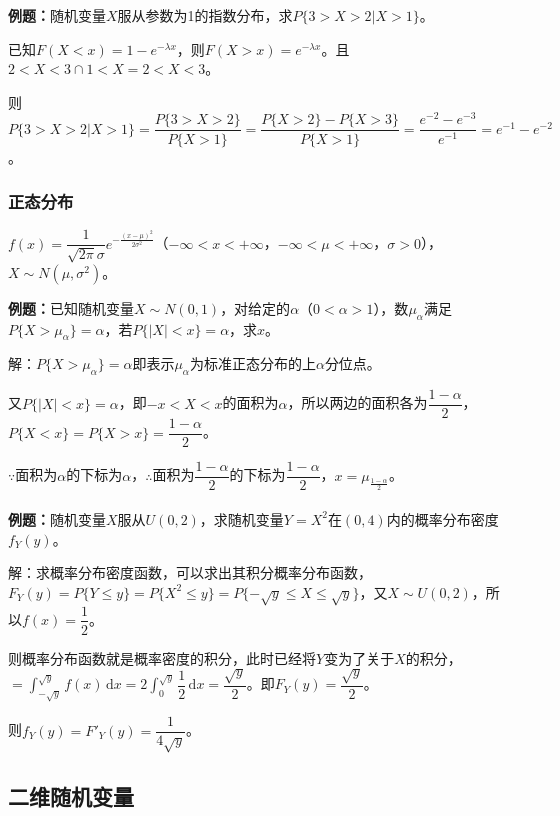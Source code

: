 \textbf{例题：}随机变量$X$服从参数为1的指数分布，求$P\{3>X>2|X>1\}$。

已知$F(X<x)=1-e^{-\lambda x}$，则$F(X>x)=e^{-\lambda x}$。且$2<X<3\cap 1<X=2<X<3$。

则$P\{3>X>2|X>1\}=\dfrac{P\{3>X>2\}}{P\{X>1\}}=\dfrac{P\{X>2\}-P\{X>3\}}{P\{X>1\}}=\dfrac{e^{-2}-e^{-3}}{e^{-1}}=e^{-1}-e^{-2}$。

\subsubsection{正态分布}

$f(x)=\dfrac{1}{\sqrt{2\pi}\sigma}e^{-\frac{(x-\mu)^2}{2\sigma^2}}$（$-\infty<x<+\infty$，$-\infty<\mu<+\infty$，$\sigma>0$），$X\sim N(\mu,\sigma^2)$。

\textbf{例题：}已知随机变量$X\sim N(0,1)$，对给定的$\alpha$（$0<\alpha>1$），数$\mu_\alpha$满足$P\{X>\mu_\alpha\}=\alpha$，若$P\{\vert X\vert<x\}=\alpha$，求$x$。

解：$P\{X>\mu_\alpha\}=\alpha$即表示$\mu_\alpha$为标准正态分布的上$\alpha$分位点。

又$P\{\vert X\vert<x\}=\alpha$，即$-x<X<x$的面积为$\alpha$，所以两边的面积各为$\dfrac{1-\alpha}{2}$，$P\{X<x\}=P\{X>x\}=\dfrac{1-\alpha}{2}$。

$\because$面积为$\alpha$的下标为$\alpha$，$\therefore$面积为$\dfrac{1-\alpha}{2}$的下标为$\dfrac{1-\alpha}{2}$，$x=\mu_\frac{1-\alpha}{2}$。

\paragraph{}

\textbf{例题：}随机变量$X$服从$U(0,2)$，求随机变量$Y=X^2$在$(0,4)$内的概率分布密度$f_Y(y)$。

解：求概率分布密度函数，可以求出其积分概率分布函数，$F_Y(y)=P\{Y\leqslant y\}=P\{X^2\leqslant y\}=P\{-\sqrt{y}\leqslant X\leqslant\sqrt{y}\}$，又$X\sim U(0,2)$，所以$f(x)=\dfrac{1}{2}$。

则概率分布函数就是概率密度的积分，此时已经将$Y$变为了关于$X$的积分，$=\int_{-\sqrt{y}}^{\sqrt{y}}f(x)\,\textrm{d}x=$$\displaystyle{2\int_0^{\sqrt{y}}\dfrac{1}{2}\,\textrm{d}x}=\dfrac{\sqrt{y}}{2}$。即$F_Y(y)=\dfrac{\sqrt{y}}{2}$。

则$f_Y(y)=F'_Y(y)=\dfrac{1}{4\sqrt{y}}$。

\subsection{二维随机变量}

